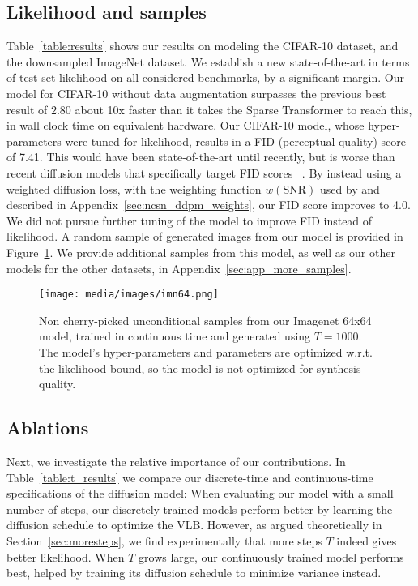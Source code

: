 \documentclass{article}
\newcommand{\snr}{\text{SNR}}
\begin{document}
\subsection{Likelihood and samples}
Table~\ref{table:results} shows our results on modeling the CIFAR-10 dataset, and the downsampled ImageNet dataset. We establish a new state-of-the-art in terms of test set likelihood on all considered benchmarks, by a significant margin. Our model for CIFAR-10 without data augmentation surpasses the previous best result of $2.80$ about 10x faster than it takes the Sparse Transformer to reach this, in wall clock time on equivalent hardware.
Our CIFAR-10 model, whose hyper-parameters were tuned for likelihood, results in a FID (perceptual quality) score of 7.41. This would have been state-of-the-art until recently, but is worse than recent diffusion models that specifically target FID scores ~\citep{nichol2021improved,song2020score,ho2020denoising}. By instead using a weighted diffusion loss, with the weighting function $w(\snr)$ used by \cite{ho2020denoising} and described in Appendix~\ref{sec:ncsn_ddpm_weights}, our FID score improves to 4.0. We did not pursue further tuning of the model to improve FID instead of likelihood.
A random sample of generated images from our model is provided in Figure~\ref{fig:imagenet64}. We provide additional samples from this model, as well as our other models for the other datasets, in Appendix~\ref{sec:app_more_samples}.
\begin{figure}[t]
    \centering
    \texttt{[image: media/images/imn64.png]}
    \caption{Non cherry-picked unconditional samples from our Imagenet 64x64 model, trained in continuous time and generated using $T=1000$. The model's hyper-parameters and parameters are optimized w.r.t. the likelihood bound, so the model is not optimized for synthesis quality.}
    \label{fig:imagenet64}
\end{figure}

\subsection{Ablations}
Next, we investigate the relative importance of our contributions. In Table~\ref{table:t_results} we compare our discrete-time and continuous-time specifications of the diffusion model: When evaluating our model with a small number of steps, our discretely trained models perform better by learning the diffusion schedule to optimize the VLB. However, as argued theoretically in Section~\ref{sec:moresteps}, we find experimentally that more steps $T$ indeed gives better likelihood. When $T$ grows large, our continuously trained model performs best, helped by training its diffusion schedule to minimize variance instead. 
\end{document}
